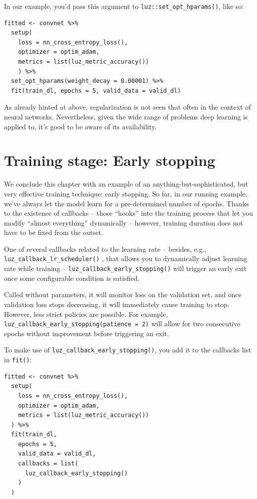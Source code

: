 \documentclass[
  letterpaper,
]{krantz}
\begin{document}
In our example, you'd pass this argument to
\texttt{luz::set\_opt\_hparams()}, like so:

\begin{verbatim}
fitted <- convnet %>%
  setup(
    loss = nn_cross_entropy_loss(),
    optimizer = optim_adam,
    metrics = list(luz_metric_accuracy())
    ) %>%
  set_opt_hparams(weight_decay = 0.00001) %>%
  fit(train_dl, epochs = 5, valid_data = valid_dl)
\end{verbatim}

As already hinted at above, regularization is not seen that often in the
context of neural networks. Nevertheless, given the wide range of
problems deep learning is applied to, it's good to be aware of its
availability.

\hypertarget{training-stage-early-stopping}{%
\section{\texorpdfstring{Training stage: Early
stopping}{Training stage: Early stopping}}\label{training-stage-early-stopping}}

We conclude this chapter with an example of an
anything-but-sophisticated, but very effective training technique: early
stopping. So far, in our running example, we've always let the model
learn for a pre-determined number of epochs. Thanks to the existence of
callbacks -- those ``hooks'' into the training process that let you
modify ``almost everything'' dynamically -- however, training duration
does not have to be fixed from the outset.

One of several callbacks related to the learning rate -- besides, e.g.,
\texttt{luz\_callback\_lr\_scheduler()} , that allows you to dynamically
adjust learning rate while training --
\texttt{luz\_callback\_early\_stopping()} will trigger an early exit
once some configurable condition is satisfied.

Called without parameters, it will monitor loss on the validation set,
and once validation loss stops decreasing, it will immediately cause
training to stop. However, less strict policies are possible. For
example, \texttt{luz\_callback\_early\_stopping(patience\ =\ 2)} will
allow for two consecutive epochs without improvement before triggering
an exit.

To make use of \texttt{luz\_callback\_early\_stopping()}, you add it to
the callbacks list in \texttt{fit()}:

\begin{verbatim}
fitted <- convnet %>%
  setup(
    loss = nn_cross_entropy_loss(),
    optimizer = optim_adam,
    metrics = list(luz_metric_accuracy())
  ) %>%
  fit(train_dl,
    epochs = 5,
    valid_data = valid_dl,
    callbacks = list(
      luz_callback_early_stopping()
    )
  )
\end{verbatim}
\end{document}
